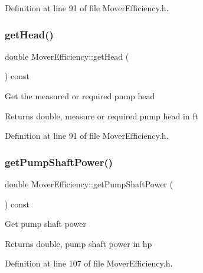 Definition at line 91 of file Mover\+Efficiency.\+h.

\mbox{\label{class_mover_efficiency_a9ce5f2dba38ae4f271bdb2c018667144}} 
\subsubsection{\texorpdfstring{get\+Head()}{getHead()}\hspace{0.1cm}{\footnotesize\ttfamily [3/3]}}
{\footnotesize\ttfamily double Mover\+Efficiency\+::get\+Head (\begin{DoxyParamCaption}{ }\end{DoxyParamCaption}) const\hspace{0.3cm}{\ttfamily [inline]}}

Get the measured or required pump head \begin{DoxyReturn}{Returns}
double, measure or required pump head in ft 
\end{DoxyReturn}


Definition at line 91 of file Mover\+Efficiency.\+h.

\mbox{\label{class_mover_efficiency_a367c3cb3a070cef9de5e3ca87bbf62fe}} 
\subsubsection{\texorpdfstring{get\+Pump\+Shaft\+Power()}{getPumpShaftPower()}\hspace{0.1cm}{\footnotesize\ttfamily [1/3]}}
{\footnotesize\ttfamily double Mover\+Efficiency\+::get\+Pump\+Shaft\+Power (\begin{DoxyParamCaption}{ }\end{DoxyParamCaption}) const\hspace{0.3cm}{\ttfamily [inline]}}

Get pump shaft power \begin{DoxyReturn}{Returns}
double, pump shaft power in hp 
\end{DoxyReturn}


Definition at line 107 of file Mover\+Efficiency.\+h.

